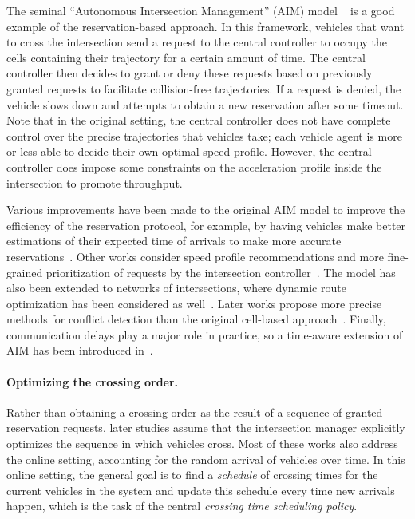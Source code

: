 \documentclass[a4paper]{report}
\theoremstyle{definition}
\theoremstyle{plain}
\begin{document}
The seminal ``Autonomous Intersection Management'' (AIM) model ~\cite{dresnerMultiagentTrafficManagement2004,dresnerMultiagentApproachAutonomous2008} is a
good example of the reservation-based approach.
%
In this framework, vehicles that want to cross the intersection send a request
to the central controller to occupy the cells containing their trajectory for a
certain amount of time. The central controller then decides to grant or deny
these requests based on previously granted requests to facilitate collision-free
trajectories. If a request is denied, the vehicle slows down and attempts to
obtain a new reservation after some timeout.
%
Note that in the original setting, the central controller does not have complete
control over the precise trajectories that vehicles take; each vehicle agent is
more or less able to decide their own optimal speed profile.
%
However, the central controller does impose some constraints on the acceleration
profile inside the intersection to promote throughput.

Various improvements have been made to the original AIM model to improve the
efficiency of the reservation protocol, for example, by having vehicles make
better estimations of their expected time of arrivals to make more accurate
reservations~\cite{auMotionPlanningAlgorithms2010}.
%
Other works consider speed profile recommendations and more fine-grained
prioritization of requests by the intersection
controller~\cite{huangAssessingMobilityEnvironmental2012}.
%
The model has also been extended to networks of intersections, where dynamic
route optimization has been considered as well~\cite{hausknechtAutonomousIntersectionManagement2011}.
%
Later works propose more precise methods for conflict detection than the
original cell-based approach~\cite{levinConflictpointFormulationIntersection2017,liTemporalspatialDimensionExtensionbased2019}.
%
Finally, communication delays play a major role in practice, so a time-aware
extension of AIM has been introduced
in~\cite{khayatianCrossroadsTimeawareApproach2020}.


\paragraph{Optimizing the crossing order.}

Rather than obtaining a crossing order as the result of a sequence of granted
reservation requests, later studies assume that the intersection manager
explicitly optimizes the sequence in which vehicles cross. Most of these works
also address the online setting, accounting for the random arrival of vehicles
over time.
%
In this online setting, the general goal is to find a \emph{schedule} of
crossing times for the current vehicles in the system and update this schedule
every time new arrivals happen, which is the task of the central \emph{crossing
  time scheduling policy}.
\end{document}
